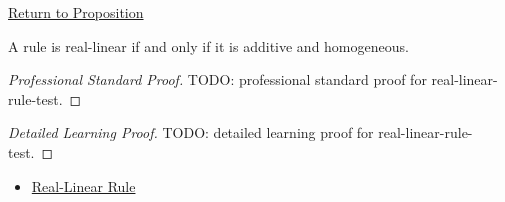 \newpage
{}
\label{prf:real-linear-rule-test}

\begin{remark*}[Return]
\hyperref[prop:real-linear-rule-test]{Return to Proposition}
\end{remark*}

\begin{proposition*}
A rule is real-linear if and only if it is additive and homogeneous.
\end{proposition*}

\begin{proof}[Professional Standard Proof]
\LRAProofBodyStart
TODO: professional standard proof for real-linear-rule-test.
\end{proof}

\begin{proof}[Detailed Learning Proof]
\LRAProofBodyStart
TODO: detailed learning proof for real-linear-rule-test.
\end{proof}

\begin{remark*}
\end{remark*}

\begin{dependencies}
\begin{itemize}
  \item \hyperref[def:real-linear-rule]{Real-Linear Rule}
\end{itemize}
\end{dependencies}

\clearpage
